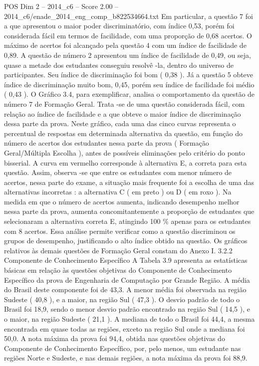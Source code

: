 \begin{textsample}{POS Dim 2 – 2014\_c6 – Score 2.00 – 2014\_c6/enade\_2014\_eng\_comp\_b822534664.txt}
Em particular, a questão 7 foi a que apresentou o maior poder discriminatório, com índice 0,53, porém foi considerada fácil em termos de facilidade, com uma proporção de 0,68 acertos.
O máximo de acertos foi alcançado pela questão 4 com um índice de facilidade de 0,89.
A questão de número 2 apresentou um índice de facilidade de 0,49, ou seja, quase a metade dos estudantes conseguiu resolvê -la, dentro do universo de participantes.
Seu índice de discriminação foi bom ( 0,38 ).
Já a questão 5 obteve índice de discriminação muito bom, 0,45, porém seu índice de facilidade foi médio ( 0,43 ).
O Gráfico 3.4, para exemplificar, analisa o comportamento da questão de número 7 de Formação Geral.
Trata -se de uma questão considerada fácil, com relação ao índice de facilidade e a que obteve o maior índice de discriminação dessa parte da prova.
Neste gráfico, cada uma das cinco curvas representa o percentual de respostas em determinada alternativa da questão, em função do número de acertos dos estudantes nessa parte da prova ( Formação Geral/Múltipla Escolha ), antes de possíveis eliminações pelo critério do ponto bisserial.
A curva em vermelho corresponde à alternativa E, a correta para esta questão.
Assim, observa -se que entre os estudantes com menor número de acertos, nessa parte do exame, a situação mais frequente foi a escolha de uma das alternativas incorretas : a alternativa C ( em preto ) ou D ( em roxo ).
Na medida em que o número de acertos aumenta, indicando desempenho melhor nessa parte da prova, aumenta concomitantemente a proporção de estudantes que selecionaram a alternativa correta E, atingindo 100 \% apenas para os estudantes com 8 acertos.
Essa análise permite verificar como a questão discriminou os grupos de desempenho, justificando o alto índice obtido na questão.
Os gráficos relativos às demais questões de Formação Geral constam do Anexo I. 3.2.2 Componente de Conhecimento Específico A Tabela 3.9 apresenta as estatísticas básicas em relação às questões objetivas do Componente de Conhecimento Específico da prova de Engenharia de Computação por Grande Região.
A média do Brasil deste componente foi de 43,3.
A menor média foi observada na região Sudeste ( 40,8 ), e a maior, na região Sul ( 47,3 ).
O desvio padrão de todo o Brasil foi 18,9, sendo o menor desvio padrão encontrado na região Sul ( 14,5 ), e o maior, na região Sudeste ( 21,1 ).
A mediana de todo o Brasil foi 44,4, a mesma encontrada em quase todas as regiões, exceto na região Sul onde a mediana foi 50,0.
A nota máxima da prova foi 94,4, obtida nas questões objetivas do Componente de Conhecimento Específico, por, pelo menos, um estudante nas regiões Norte e Sudeste, e nas demais regiões, a nota máxima da prova foi 88,9.

\end{textsample}
